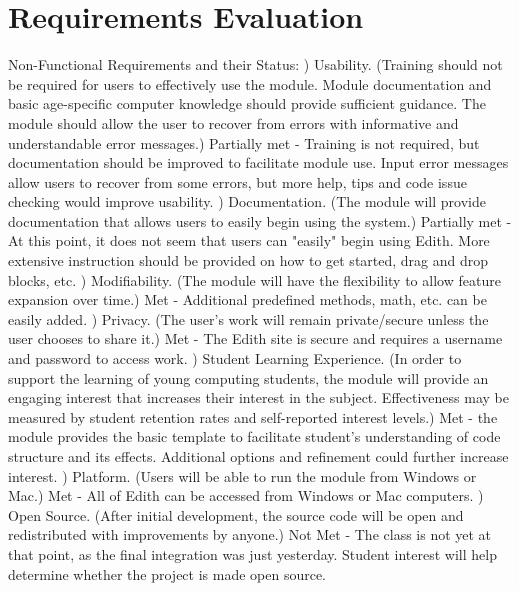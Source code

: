 \documentclass[a4paper]{article}
\begin{document}
\section{Requirements Evaluation}

Non-Functional Requirements and their Status: \newline {}) Usability.  (Training should not be required for users to effectively use the module.  
Module documentation and basic age-specific computer knowledge should provide sufficient guidance.
The module should allow the user to recover from errors with informative and understandable error messages.) Partially met - Training is not required, but documentation should be improved to facilitate module use.  Input error messages allow users to recover from some errors, but more help, tips and code issue checking would improve usability.  \newline {}) Documentation. (The module will provide documentation that allows users to easily begin using the system.) Partially met - At this point, it does not seem that users can "easily" begin using Edith.  More extensive instruction should be provided on how to get started, drag and drop blocks, etc.  \newline {}) Modifiability.  (The module will have the flexibility to allow feature expansion over time.) Met - Additional predefined methods, math, etc. can be easily added. \newline {}) Privacy.  (The user's work will remain private/secure unless the user chooses to share it.) Met - The Edith site is secure and requires a username and password to access work. \newline {}) Student Learning Experience.  (In order to support the learning of young computing students, the module will provide an engaging interest that increases their interest in the subject.  Effectiveness may be measured by student retention rates and self-reported interest levels.) Met - the module provides the basic template to facilitate student's understanding of code structure and its effects.  Additional options and refinement could further increase interest. \newline {}) Platform.  (Users will be able to run the module from Windows or Mac.)  Met - All of Edith can be accessed from Windows or Mac computers.  \newline {}) Open Source.  (After initial development, the source code will be open and redistributed with improvements by anyone.) Not Met - The class is not yet at that point, as the final integration was just yesterday.  Student interest will help determine whether the project is made open source. \newline \newline 
\end{document}
